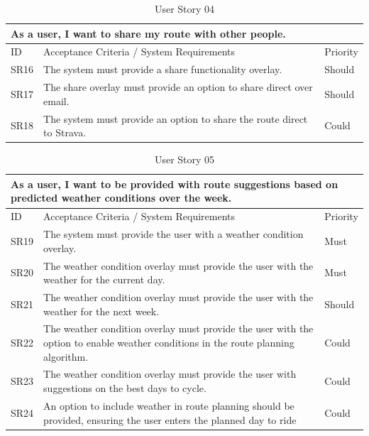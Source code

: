 \begin{table}[!htb]
  \caption{User Story 04}
  \label{tab:user-story-04}
  \begin{tabular}{ m{1cm} m{11cm} m{1cm} }
  \hline
  \multicolumn{3}{p{13cm}}{As a user, I want to share my route with other people.}\\ 
  \hline
  ID & Acceptance Criteria / System Requirements & Priority\\
  \hline
  \label{SR:16}SR16 & The system must provide a share functionality overlay. & Should \\
  \label{SR:17}SR17 & The share overlay must provide an option to share direct over email. & Should\\
  \label{SR:18}SR18 & The system must provide an option to share the route direct to Strava. & Could\\ 
  \hline
  \end{tabular}
\end{table}

\begin{table}[!htb]
  \caption{User Story 05}
  \label{tab:user-story-05}
  \begin{tabular}{ m{1cm} m{11cm} m{1cm} }
  \hline
  \multicolumn{3}{p{13cm}}{As a user, I want to be provided with route suggestions based on predicted weather conditions over the week.}\\ 
  \hline
  ID & Acceptance Criteria / System Requirements & Priority\\
  \hline
  \label{SR:19}SR19 & The system must provide the user with a weather condition overlay. & Must \\
  \label{SR:20}SR20 & The weather condition overlay must provide the user with the weather for the current day. & Must\\
  \label{SR:21}SR21 & The weather condition overlay must provide the user with the weather for the next week. & Should\\
  \label{SR:22}SR22 & The weather condition overlay must provide the user with the option to enable weather conditions in the route planning algorithm. & Could\\ 
  \label{SR:23}SR23 & The weather condition overlay must provide the user with suggestions on the best days to cycle. & Could\\
  \label{SR:24}SR24 & An option to include weather in route planning should be provided, ensuring the user enters the planned day to ride & Could\\ 
  \hline
  \end{tabular}
\end{table}

